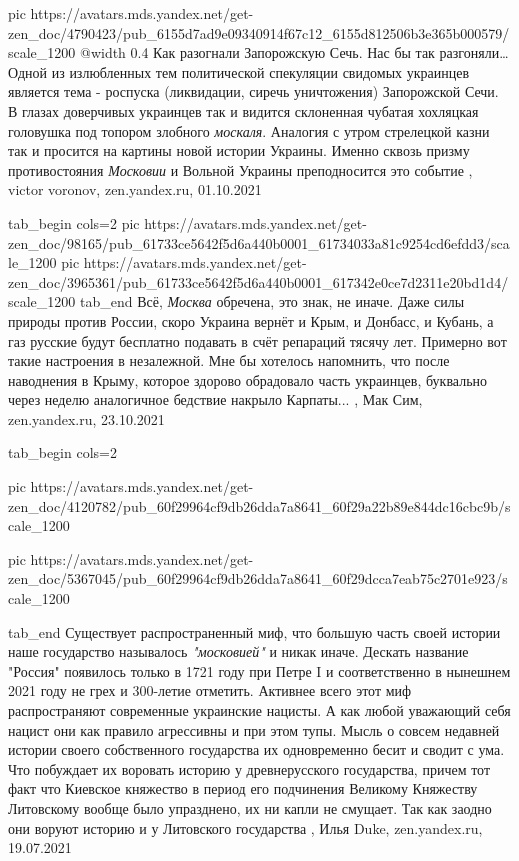 \ifcmt
  pic https://avatars.mds.yandex.net/get-zen_doc/4790423/pub_6155d7ad9e09340914f67c12_6155d812506b3e365b000579/scale_1200
  @width 0.4
\fi
Как разогнали Запорожскую Сечь. Нас бы так разгоняли… Одной из излюбленных тем
политической спекуляции свидомых украинцев является тема - роспуска
(ликвидации, сиречь уничтожения) Запорожской Сечи. В глазах доверчивых
украинцев так и видится склоненная чубатая хохляцкая головушка под топором
злобного \emph{москаля}. Аналогия с утром стрелецкой казни так и просится на картины
новой истории Украины. Именно сквозь призму противостояния \emph{Московии} и Вольной
Украины преподносится это событие
, 
victor voronov, zen.yandex.ru, 01.10.2021


\ifcmt
  tab_begin cols=2
     pic https://avatars.mds.yandex.net/get-zen_doc/98165/pub_61733ce5642f5d6a440b0001_61734033a81c9254cd6efdd3/scale_1200
     pic https://avatars.mds.yandex.net/get-zen_doc/3965361/pub_61733ce5642f5d6a440b0001_617342e0ce7d2311e20bd1d4/scale_1200
  tab_end
\fi
Всё, \emph{Москва} обречена, это знак, не иначе. Даже силы природы против России,
скоро Украина вернёт и Крым, и Донбасс, и Кубань, а газ русские будут бесплатно
подавать в счёт репараций тясячу лет. Примерно вот такие настроения в
незалежной. Мне бы хотелось напомнить, что после наводнения в Крыму, которое
здорово обрадовало часть украинцев, буквально через неделю аналогичное бедствие
накрыло Карпаты...
, Мак Сим, zen.yandex.ru, 23.10.2021

\ifcmt
  tab_begin cols=2

     pic https://avatars.mds.yandex.net/get-zen_doc/4120782/pub_60f29964cf9db26dda7a8641_60f29a22b89e844dc16cbc9b/scale_1200

     pic https://avatars.mds.yandex.net/get-zen_doc/5367045/pub_60f29964cf9db26dda7a8641_60f29dcca7eab75c2701e923/scale_1200

  tab_end
\fi
Существует распространенный миф, что большую часть своей истории наше
государство называлось \emph{"московией"} и никак иначе. Дескать название "Россия"
появилось только в 1721 году при Петре I и соответственно в нынешнем 2021 году
не грех и 300-летие отметить.  Активнее всего этот миф распространяют
современные украинские нацисты. А как любой уважающий себя нацист они как
правило агрессивны и при этом тупы. Мысль о совсем недавней истории своего
собственного государства их одновременно бесит и сводит с ума. Что побуждает их
воровать историю у древнерусского государства, причем тот факт что Киевское
княжество в период его подчинения Великому Княжеству Литовскому вообще было
упразднено, их ни капли не смущает. Так как заодно они воруют историю и у
Литовского государства
, Илья Duke, zen.yandex.ru, 19.07.2021

